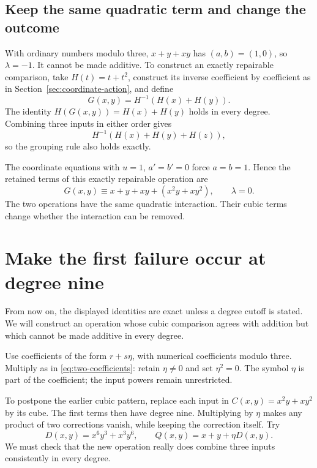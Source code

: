 \subsection{Keep the same quadratic term and change the outcome}

With ordinary numbers modulo three, \(x+y+xy\) has \((a,b)=(1,0)\), so \(\lambda=-1\). It cannot be made additive. To construct an exactly repairable comparison, take \(H(t)=t+t^2\), construct its inverse coefficient by coefficient as in Section~\ref{sec:coordinate-action}, and define
\begin{equation}\label{eq:pullback-example}
 G(x,y)=H^{-1}(H(x)+H(y)).
\end{equation}
The identity \(H(G(x,y))=H(x)+H(y)\) holds in every degree. Combining three inputs in either order gives
\[
 H^{-1}(H(x)+H(y)+H(z)),
\]
so the grouping rule also holds exactly.

The coordinate equations with \(u=1\), \(a'=b'=0\) force \(a=b=1\). Hence the retained terms of this exactly repairable operation are
\[
 G(x,y)\equiv x+y+xy+(x^2y+xy^2),\qquad\lambda=0.
\]
The two operations have the same quadratic interaction. Their cubic terms change whether the interaction can be removed.

\section{Make the first failure occur at degree nine}\label{sec:later-obstruction}

From now on, the displayed identities are exact unless a degree cutoff is stated. We will construct an operation whose cubic comparison agrees with addition but which cannot be made additive in every degree.

Use coefficients of the form \(r+s\eta\), with numerical coefficients modulo three. Multiply as in \eqref{eq:two-coefficients}: retain \(\eta\ne0\) and set \(\eta^2=0\). The symbol \(\eta\) is part of the coefficient; the input powers remain unrestricted.

To postpone the earlier cubic pattern, replace each input in \(C(x,y)=x^2y+xy^2\) by its cube. The first terms then have degree nine. Multiplying by \(\eta\) makes any product of two corrections vanish, while keeping the correction itself. Try
\[
 D(x,y)=x^6y^3+x^3y^6,
 \qquad Q(x,y)=x+y+\eta D(x,y).
\]
We must check that the new operation really does combine three inputs consistently in every degree.

